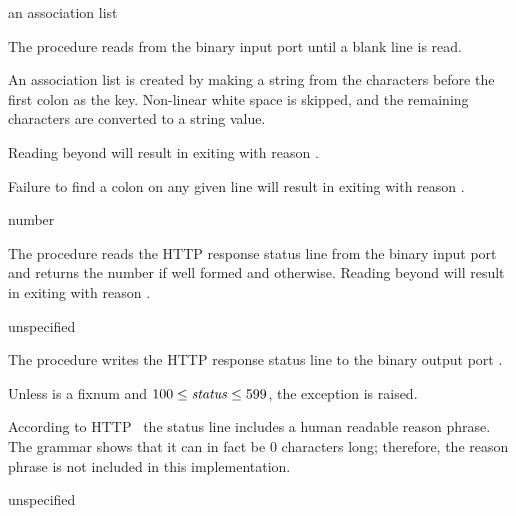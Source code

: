 \begin{procedure}
\end{procedure}
\returns{} an association list

The  procedure reads from the binary input
port  until a blank line is read.

An association list is created by making a string from the characters
before the first colon as the key. Non-linear white space is skipped,
and the remaining characters are converted to a string value.

Reading beyond  will result in exiting with reason
.

Failure to find a colon on any given line will result in exiting with
reason .

\begin{procedure}
\end{procedure}
\returns{} number \alt{} 

The  procedure reads the HTTP response status
line from the binary input port  and returns the number if
well formed and  otherwise. Reading beyond 
will result in exiting with reason .

\begin{procedure}
\end{procedure}
\returns{} unspecified

The  procedure writes the HTTP response
status line to the binary output port .

Unless  is a fixnum and $100 \leq \var{status} \leq 599$, the
exception  is
raised.

According to HTTP~\cite{RFC7230} the status line includes a human
readable reason phrase. The grammar shows that it can in fact be 0
characters long; therefore, the reason phrase is not included in this
implementation.

\begin{procedure}
\end{procedure}
\returns{} unspecified


